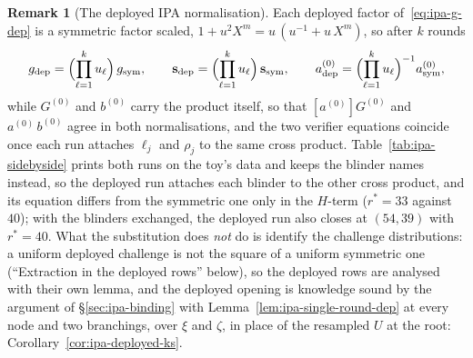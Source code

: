 \documentclass[11pt,a4paper]{article}
\theoremstyle{definition}
\newtheorem{remark}[theorem]{Remark}
\begin{document}
\begin{remark}[The deployed IPA normalisation]
Each deployed factor of~\eqref{eq:ipa-g-dep} is a symmetric factor
scaled, $1 + u^{2}X^{m} = u\,(u^{-1} + u\,X^{m})$, so after $k$ rounds
\[
g_{\mathrm{dep}} = \Bigl(\prod_{\ell=1}^{k} u_\ell\Bigr)\,g_{\mathrm{sym}},
\qquad
\mathbf s_{\mathrm{dep}}
  = \Bigl(\prod_{\ell=1}^{k} u_\ell\Bigr)\,\mathbf s_{\mathrm{sym}},
\qquad
a^{(0)}_{\mathrm{dep}}
  = \Bigl(\prod_{\ell=1}^{k} u_\ell\Bigr)^{-1} a^{(0)}_{\mathrm{sym}},
\]
while $G^{(0)}$ and $b^{(0)}$ carry the product itself, so that
$[a^{(0)}]G^{(0)}$ and $a^{(0)}\,b^{(0)}$ agree in both normalisations,
and the two verifier equations coincide once each run attaches $\ell_j$
and $\rho_j$ to the same cross product.
Table~\ref{tab:ipa-sidebyside} prints both runs on the toy's data and
keeps the blinder names instead, so the deployed run attaches each
blinder to the other cross product, and its equation differs from the
symmetric one only in the $H$-term ($r^{*} = 33$ against $40$); with the
blinders exchanged, the deployed run also closes at $(54, 39)$ with
$r^{*} = 40$. What the substitution does \emph{not} do is identify the
challenge distributions: a uniform deployed challenge is not the square
of a uniform symmetric one (``Extraction in the deployed rows'' below), so
the deployed rows are analysed with their own lemma, and the deployed
opening is knowledge sound by the argument of \S\ref{sec:ipa-binding}
with Lemma~\ref{lem:ipa-single-round-dep} at every node and two
branchings, over $\xi$ and $\zeta$, in place of the resampled $U$ at
the root: Corollary~\ref{cor:ipa-deployed-ks}.
\end{remark}
\end{document}
